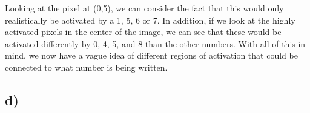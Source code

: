 \documentclass[12pt]{article}
\begin{document}
Looking at the pixel at (0,5), we can consider the fact that this would only realistically be activated by a 1, 5, 6 
or 7. In addition, if we look at the highly activated pixels in the center of the image, we can see that these would be 
activated differently by 0, 4, 5, and 8 than the other numbers. With all of this in mind, we now have a vague idea of 
different regions of activation that could be connected to what number is being written.

\subsection{d)}
\end{document}
